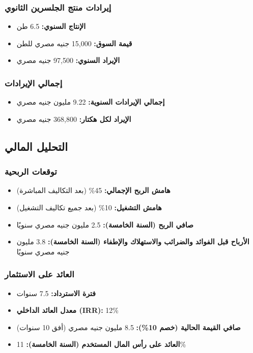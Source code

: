 \subsubsection{إيرادات منتج الجلسرين الثانوي}
\begin{itemize}
    \item \textbf{الإنتاج السنوي:} 6.5 طن
    \item \textbf{قيمة السوق:} 15,000 جنيه مصري للطن
    \item \textbf{الإيراد السنوي:} 97,500 جنيه مصري
\end{itemize}

\subsubsection{إجمالي الإيرادات}
\begin{itemize}
    \item \textbf{إجمالي الإيرادات السنوية:} 9.22 مليون جنيه مصري
    \item \textbf{الإيراد لكل هكتار:} 368,800 جنيه مصري
\end{itemize}

\subsection{التحليل المالي}

\subsubsection{توقعات الربحية}
\begin{itemize}
    \item \textbf{هامش الربح الإجمالي:} 45\% (بعد التكاليف المباشرة)
    \item \textbf{هامش التشغيل:} 10\% (بعد جميع تكاليف التشغيل)
    \item \textbf{صافي الربح (السنة الخامسة):} 2.5 مليون جنيه مصري سنويًا
    \item \textbf{الأرباح قبل الفوائد والضرائب والاستهلاك والإطفاء (السنة الخامسة):} 3.8 مليون جنيه مصري سنويًا
\end{itemize}

\subsubsection{العائد على الاستثمار}
\begin{itemize}
    \item \textbf{فترة الاسترداد:} 7.5 سنوات
    \item \textbf{معدل العائد الداخلي (IRR):} 12\%
    \item \textbf{صافي القيمة الحالية (خصم 10\%):} 8.5 مليون جنيه مصري (أفق 10 سنوات)
    \item \textbf{العائد على رأس المال المستخدم (السنة الخامسة):} 11\%
\end{itemize}

